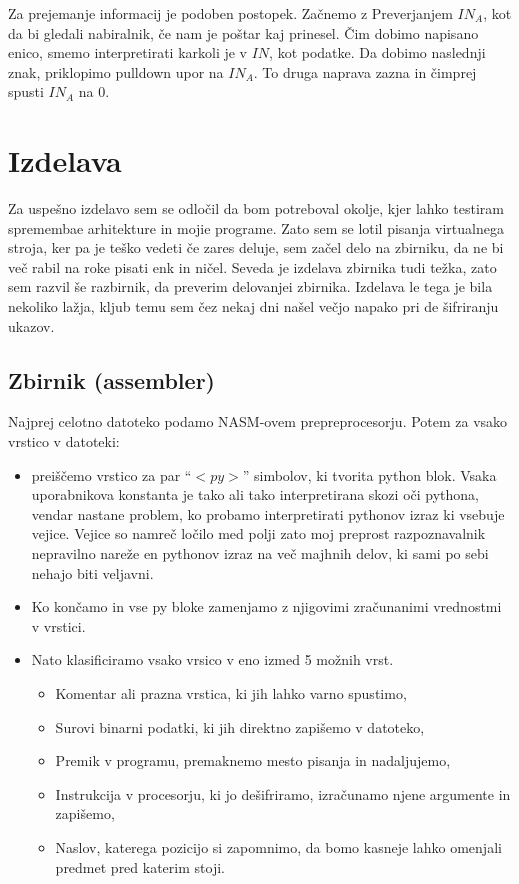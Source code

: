 \documentclass[12pt]{article}
\begin{document}
Za prejemanje informacij je podoben postopek.
Začnemo z Preverjanjem $IN_{A}$, kot da bi gledali nabiralnik, če nam je poštar kaj prinesel.
Čim dobimo napisano enico, smemo interpretirati karkoli je v $IN$, kot podatke.
Da dobimo naslednji znak, priklopimo pulldown upor na $IN_{A}$.
To druga naprava zazna in čimprej spusti $IN_{A}$ na 0.


\section{Izdelava} %
Za uspešno izdelavo sem se odločil da bom potreboval okolje, kjer lahko testiram spremembae arhitekture in mojie programe.
Zato sem se lotil pisanja virtualnega stroja, ker pa je teško vedeti če zares deluje, sem začel delo na zbirniku, da ne bi več rabil na roke pisati enk in ničel.
Seveda je izdelava zbirnika tudi težka, zato sem razvil še razbirnik, da preverim delovanjei zbirnika.
Izdelava le tega je bila nekoliko lažja, kljub temu sem čez nekaj dni našel večjo napako pri de šifriranju ukazov.

\subsection{Zbirnik (assembler)}
Najprej celotno datoteko podamo NASM-ovem prepreprocesorju.
Potem za vsako vrstico v datoteki:
\begin{itemize}
  \item preiščemo vrstico za par ``$<py>$'' simbolov, ki tvorita python blok.
  Vsaka uporabnikova konstanta je tako ali tako interpretirana skozi oči pythona, vendar nastane problem, ko probamo interpretirati pythonov izraz ki vsebuje vejice.
  Vejice so namreč ločilo med polji zato moj preprost razpoznavalnik nepravilno nareže en pythonov izraz na več majhnih delov, ki sami po sebi nehajo biti veljavni.
  \item Ko končamo in vse py bloke zamenjamo z njigovimi zračunanimi vrednostmi v vrstici.
  \item Nato klasificiramo vsako vrsico v eno izmed 5 možnih vrst.
  \begin{itemize}
    \item Komentar ali prazna vrstica, ki jih lahko varno spustimo,
    \item Surovi binarni podatki, ki jih direktno zapišemo v datoteko,
    \item Premik v programu, premaknemo mesto pisanja in nadaljujemo,
    \item Instrukcija v procesorju, ki jo dešifriramo, izračunamo njene argumente in zapišemo,
    \item Naslov, katerega pozicijo si zapomnimo, da bomo kasneje lahko omenjali predmet pred katerim stoji.
  \end{itemize}
\end{itemize}
\end{document}
